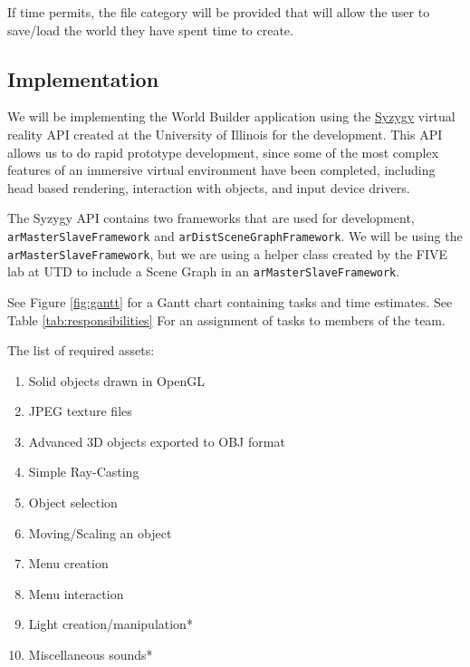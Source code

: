 If time permits, the file category will be provided that will allow the user to save/load the world they have spent time to create.

\subsection{Implementation}
We will be implementing the World Builder application using the \href{http://syzygy.isl.uiuc.edu/szg/szgsrc/doc/index.html}{Syzygy} virtual reality API created at the University of Illinois for the development.
This API allows us to do rapid prototype development, since some of the most complex features of an immersive virtual environment have been completed, including head based rendering, interaction with objects, and input device drivers.

The Syzygy API contains two frameworks that are used for development, \verb|arMasterSlaveFramework| and \verb|arDistSceneGraphFramework|.
We will be using the \verb|arMasterSlaveFramework|, but we are using a helper class created by the FIVE lab at UTD to include a Scene Graph in an \verb|arMasterSlaveFramework|.

See Figure \ref{fig:gantt} for a Gantt chart containing tasks and time estimates.
See Table \ref{tab:responsibilities} For an assignment of tasks to members of the team.

The list of required assets:
\begin{enumerate}
	\item Solid objects drawn in OpenGL
	\item JPEG texture files
	\item Advanced 3D objects exported to OBJ format
	\item Simple Ray-Casting
	\item Object selection
	\item Moving/Scaling an object
	\item Menu creation
	\item Menu interaction
	\item Light creation/manipulation*
	\item Miscellaneous sounds*
\end{enumerate}

